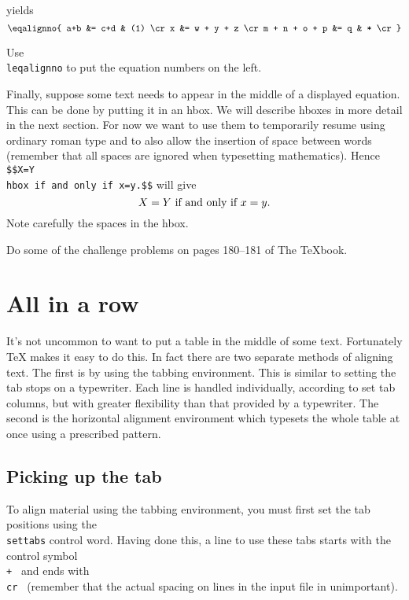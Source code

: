 \noindent 
yields 
$$\eqalignno{ 
a+b &= c+d & (1) \cr 
x &= w + y + z \cr 
m + n + o + p &= q & * \cr 
}$$ 
 
Use {\tt \\leqalignno} to put the equation numbers on the left. 
 
Finally, suppose some text needs to appear in the middle of a 
displayed equation.  This can be done by putting it in an hbox. 
We will describe hboxes in more detail in the next section. 
For now we want to use them to temporarily resume using ordinary 
roman type and to also allow the insertion of space between 
words (remember that all spaces are ignored when typesetting 
mathematics). Hence 
{\tt \$\$X=Y \\hbox\lb{} if and only if \rb x=y.\$\$} will give 
$$X=Y \hbox{ if and only if } x=y.$$ 
Note carefully the spaces in the hbox. 
 
\exercise Do some of the challenge problems on pages 180--181 of The 
\TeX book. 
 
 
 
 
\section{All in a row} 
 
It's not uncommon to want to put a table in the middle of some 
text. Fortunately \TeX{} makes it easy to do this.  In fact there 
are two separate methods of aligning text.  The first is by using 
the tabbing environment.  This is similar to setting the tab 
stops on a typewriter. Each line is handled individually, 
according to set tab columns, but with greater flexibility than 
that provided by a typewriter. The second is the horizontal 
alignment environment which typesets the whole table at once 
using a prescribed pattern. 
 
\subsection{Picking up the tab} 
 
To align material using the tabbing environment, you must first 
set the tab positions using the {\tt \\settabs} control word. 
Having done this, a line to use these tabs starts with the 
control symbol {\tt \\+ } and ends with {\tt \\cr } (remember 
that the actual spacing on lines in the input file in 
unimportant).  
 

